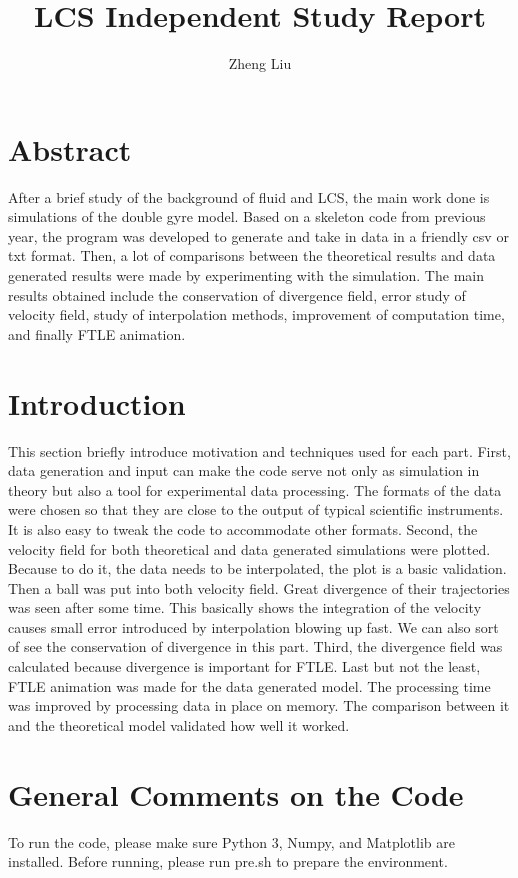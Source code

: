 \documentclass[12pt]{article}
\title{LCS Independent Study Report}
\author{Zheng Liu}
\begin{document}
\maketitle

\section{Abstract}
After a brief study of the background of fluid and LCS, the main work done is simulations of the double gyre model. Based on a skeleton code from previous year, the program was developed to generate and take in data in a friendly csv or txt format. Then, a lot of comparisons between the theoretical results and data generated results were made by experimenting with the simulation. The main results obtained include the conservation of divergence field, error study of velocity field, study of interpolation methods, improvement of computation time, and finally FTLE animation.  

\section{Introduction}
This section briefly introduce motivation and techniques used for each part. First, data generation and input can make the code serve not only as simulation in theory but also a tool for experimental data processing. The formats of the data were chosen so that they are close to the output of typical scientific instruments. It is also easy to tweak the code to accommodate other formats. Second, the velocity field for both theoretical and data generated simulations were plotted. Because to do it, the data needs to be interpolated, the plot is a basic validation. Then a ball was put into both velocity field. Great divergence of their trajectories was seen after some time. This basically shows the integration of the velocity causes small error introduced by interpolation blowing up fast. We can also sort of see the conservation of divergence in this part. Third, the divergence field was calculated because divergence is important for FTLE. Last but not the least, FTLE animation was made for the data generated model. The processing time was improved by processing data in place on memory. The comparison between it and the theoretical model validated how well it worked.    

\section{General Comments on the Code}
To run the code, please make sure Python 3, Numpy, and Matplotlib are installed. Before running, please run pre.sh to prepare the environment. 
\end{document}
